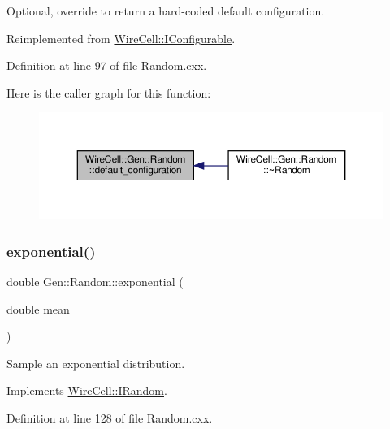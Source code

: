 Optional, override to return a hard-\/coded default configuration. 



Reimplemented from \hyperlink{class_wire_cell_1_1_i_configurable_a54841b2da3d1ea02189478bff96f7998}{Wire\+Cell\+::\+I\+Configurable}.



Definition at line 97 of file Random.\+cxx.

Here is the caller graph for this function\+:
\nopagebreak
\begin{figure}[H]
\begin{center}
\leavevmode
\includegraphics[width=350pt]{class_wire_cell_1_1_gen_1_1_random_a52d481cf1def8ba466faa65fc20529ef_icgraph}
\end{center}
\end{figure}
\mbox{\label{class_wire_cell_1_1_gen_1_1_random_adc1edd1dadf04f9e78d1c6480f6f4f1a}} 
\subsubsection{\texorpdfstring{exponential()}{exponential()}}
{\footnotesize\ttfamily double Gen\+::\+Random\+::exponential (\begin{DoxyParamCaption}\item[{double}]{mean }\end{DoxyParamCaption})\hspace{0.3cm}{\ttfamily [virtual]}}



Sample an exponential distribution. 



Implements \hyperlink{class_wire_cell_1_1_i_random_a093f57116384dacdf0bc68ae4373ae49}{Wire\+Cell\+::\+I\+Random}.



Definition at line 128 of file Random.\+cxx.


